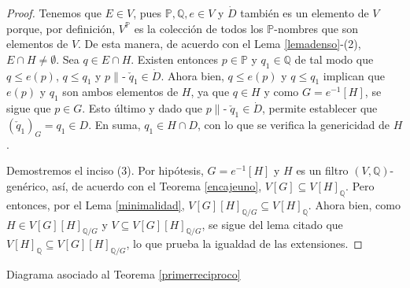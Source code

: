 \documentclass[11pt]{unam_tesis1}
\theoremstyle{MyThmStyle}
\theoremstyle{definition}
\theoremstyle{plain}
\theoremstyle{remark}
\def\forces{\mathop{\parallel\!\!\!-}\nolimits}
\let\Vdash\forces
\let\leq\leqslant
\begin{document}
\begin{proof}
Tenemos que $E\in V$, pues $\mathbb P,\mathbb Q,e\in V$ y $\dot D$ tambi\'en es un elemento de $V$ porque, por definici\'on, $V^\mathbb P$ es la colecci\'on de todos los $\mathbb P$-nombres que son elementos de $V$. De esta manera, de acuerdo con el Lema \ref{lemadenso}-(2), $E\cap H\neq \emptyset$. Sea $q\in E\cap H$. Existen entonces $p \in \mathbb P$ y $q_1 \in \mathbb Q$ de tal modo que $q \leq e(p)$, $q \leq q_1$ y $p \Vdash \check q_1 \in \dot D$. Ahora bien, $q\leq e(p)$ y $q\leq q_1$ implican que  $e(p)$ y $q_1$ son ambos elementos de $H$, ya que $q\in H$ y como $G=e^{-1}[H]$, se sigue que $p\in G$.
Esto \'ultimo y dado que $p\Vdash \check q_1 \in \dot D$, permite establecer que $(\check q_1)_G=q_1\in D$. En suma, $q_1\in H\cap D$, con lo que se verifica la genericidad de $H$.

Demostremos el inciso (3). Por hip\'otesis, $G=e^{-1}[H]$ y $H$ es un filtro $(V,\mathbb Q)$-gen\'erico, as\'i, de acuerdo con el Teorema \ref{encajeuno}, $V[G]\subseteq V[H]_{\mathbb Q}$. Pero entonces, por el Lema \ref{minimalidad}, $V[G][H]_{\mathbb Q/G}\subseteq V[H]_{\mathbb Q}$. Ahora bien, como $H\in V[G][H]_{\mathbb Q/G}$ y $V\subseteq V[G][H]_{\mathbb Q/G}$, se sigue del lema citado que $V[H]_{\mathbb Q}\subseteq V[G][H]_{\mathbb Q/G}$, lo que prueba la igualdad de las extensiones.
\end{proof}

\begin{center}

\centering

Diagrama asociado al Teorema \ref{primerreciproco}

\end{center}
\end{document}
